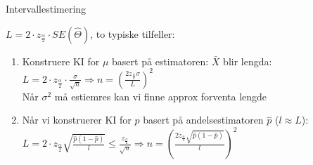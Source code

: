 \documentclass[final,hyperref={pdfpagelabels=false}]{beamer}
\begin{document}
\begin{frame}{}
\begin{columns}[t]
\begin{column}{.25\linewidth}
\begin{block}{\center Intervallestimering}
{					$L=2\cdot z_\frac{\alpha}{2}\cdot SE(\hat\Theta)$, to typiske tilfeller:
					\begin{enumerate}
						\item Konstruere KI for $\mu$ basert på estimatoren: $\bar X$ blir lengda:\\
							$L=2\cdot z_\frac{\alpha}{2}\cdot \frac{\sigma}{\sqrt{n}}\Rightarrow n=\left( \frac{2z_\frac{\alpha}{2}\sigma}{L} \right)^2$\\
							Når $\sigma^2$ må estiemres kan vi finne approx forventa lengde\\
						\item Når vi konstruerer KI for $p$ basert på andelsestimatoren $\hat p$ ($l \approx L$):\\
							$L=2\cdot z_\frac{\alpha}{2}\sqrt{\frac{\hat p (1 - \hat p)}{l}}\leq \frac{z_\frac{\alpha}{2}}{\sqrt{n}}\Rightarrow n=\left( \frac{2z_\frac{\alpha}{2}\sqrt{\hat p (1 - \hat p)}}{l} \right)^2$


\end{enumerate}}
\end{block}
\end{column}
\end{columns}
\end{frame}
\end{document}
